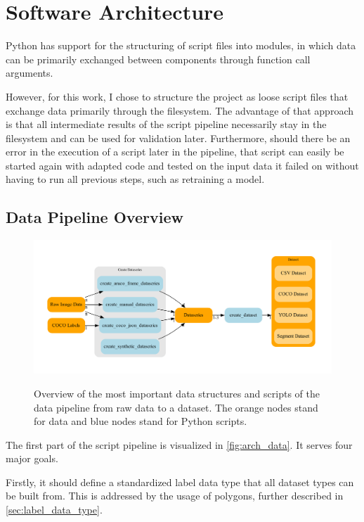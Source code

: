 \documentclass[10pt]{book}
\newcommand{\figureref}[1]{\autoref{#1}}
\begin{document}
\section{Software Architecture}

Python has support for the structuring of script files into modules, in which data can be primarily exchanged between components through function call arguments. 

However, for this work, I chose to structure the project as loose script files that exchange data primarily through the filesystem. The advantage of that approach is that all intermediate results of the script pipeline necessarily stay in the filesystem and can be used for validation later. Furthermore, should there be an error in the execution of a script later in the pipeline, that script can easily be started again with adapted code and tested on the input data it failed on without having to run all previous steps, such as retraining a model.

\subsection{Data Pipeline Overview}

\begin{figure}
  \caption{Overview of the most important data structures and scripts of the data pipeline from raw data to a dataset. The orange nodes stand for data and blue nodes stand for Python scripts.}
  \includegraphics[width=\textwidth]{graph/arch_data}
  \label{fig:arch_data}
\end{figure}

The first part of the script pipeline is visualized in \figureref{fig:arch_data}. It serves four major goals. 

Firstly, it should define a standardized label data type that all dataset types can be built from. This is addressed by the usage of polygons, further described in \autoref{sec:label_data_type}.
\end{document}
